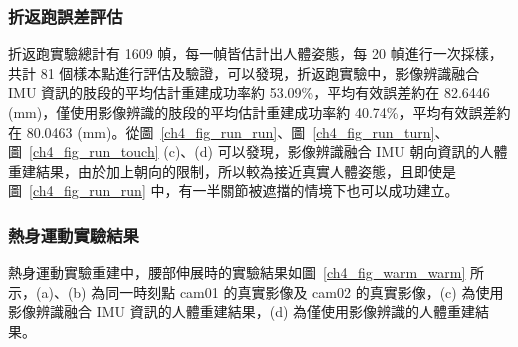 \subsubsection*{折返跑誤差評估}
折返跑實驗總計有 1609 幀，每一幀皆估計出人體姿態，每 20 幀進行一次採樣，共計 81 個樣本點進行評估及驗證，可以發現，折返跑實驗中，影像辨識融合 IMU 資訊的肢段的平均估計重建成功率約 53.09\%，平均有效誤差約在 82.6446 (mm)，僅使用影像辨識的肢段的平均估計重建成功率約 40.74\%，平均有效誤差約在 80.0463 (mm)。從圖~\ref{ch4_fig_run_run}、圖~\ref{ch4_fig_run_turn}、圖~\ref{ch4_fig_run_touch} (c)、(d) 可以發現，影像辨識融合 IMU 朝向資訊的人體重建結果，由於加上朝向的限制，所以較為接近真實人體姿態，且即使是圖~\ref{ch4_fig_run_run} 中，有一半關節被遮擋的情境下也可以成功建立。

\clearpage

\subsubsection*{熱身運動實驗結果}
熱身運動實驗重建中，腰部伸展時的實驗結果如圖~\ref{ch4_fig_warm_warm} 所示，(a)、(b) 為同一時刻點 cam01 的真實影像及 cam02 的真實影像，(c) 為使用影像辨識融合 IMU 資訊的人體重建結果，(d) 為僅使用影像辨識的人體重建結果。

